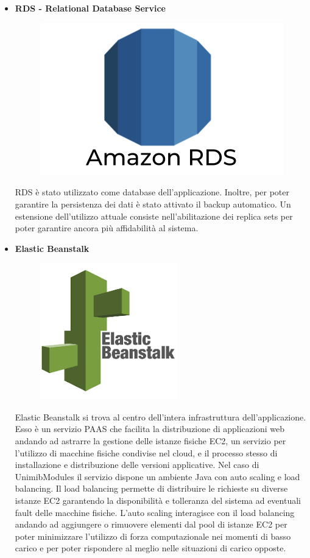 \documentclass[12pt]{article}
\begin{document}
\begin{itemize}
\item \textbf{RDS - Relational Database Service}
\begin{figure}[H]
\includegraphics[scale=0.1, left]{rds.png}
\end{figure}
RDS è stato utilizzato come database dell'applicazione. Inoltre, per poter garantire la persistenza dei dati è stato attivato il backup automatico. Un estensione dell'utilizzo attuale consiste nell'abilitazione dei replica sets per poter garantire ancora più affidabilità al sistema.
\item \textbf{Elastic Beanstalk}
\begin{figure}[H]
\includegraphics[scale=0.3, left]{elastic.png}
\end{figure}
Elastic Beanstalk si trova al centro dell'intera infrastruttura dell'applicazione. Esso è un servizio PAAS che facilita la distribuzione di applicazioni web andando ad astrarre la gestione delle istanze fisiche EC2, un servizio per l'utilizzo di macchine fisiche condivise nel cloud, e il processo stesso di installazione e distribuzione delle versioni applicative. Nel caso di UnimibModules il servizio dispone  un ambiente Java con auto scaling e load balancing. Il load balancing permette di distribuire le richieste su diverse istanze EC2 garantendo la disponibilità  e tolleranza del sistema ad eventuali fault delle macchine fisiche. L'auto scaling interagisce con il load balancing andando ad aggiungere o rimuovere elementi dal pool di istanze EC2 per poter minimizzare l'utilizzo di forza computazionale nei momenti di basso carico  e per poter rispondere al meglio nelle situazioni di carico opposte.

\end{itemize}
\end{document}
